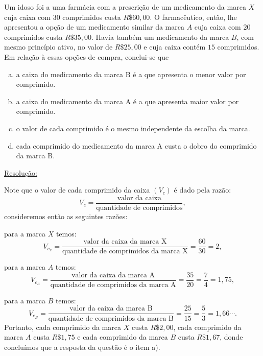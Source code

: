 \begin{exem}[Comperve - 2018]
 Um idoso foi a uma farmácia com a prescrição de um medicamento da marca $X$ cuja caixa com $30$ comprimidos custa $R\$ 60,00$. O farmacêutico, então, lhe apresentou a opção de um medicamento similar da marca $A$ cuja caixa com $20$ comprimidos custa $R\$ 35,00$. Havia também um medicamento da marca $B$, com mesmo princípio ativo, no valor de $R\$ 25,00$ e cuja caixa contém $15$ comprimidos. Em relação à essas opções de compra, conclui-se que

 \begin{enumerate}[a)]
  \item a caixa do medicamento da marca B é a que apresenta o menor valor por comprimido.
  \item a caixa do medicamento da marca A é a que apresenta maior valor por comprimido.
  \item o valor de cada comprimido é o mesmo independente da escolha da marca.
  \item cada comprimido do medicamento da marca A custa o dobro do comprimido da marca B.
 \end{enumerate}

\underline{Resolução:}

  Note que o valor de cada comprimido da caixa $(V_c)$ é dado pela razão:
\begin{equation}
V_c= \frac{\text{valor da caixa}}{\text{quantidade de comprimidos}} ,
\end{equation}
  consideremos então as seguintes razões:

  para a marca $X$ temos:
\begin{equation}
V_{c_x}=\frac{\text{valor da caixa da marca X}}{\text{quantidade de comprimidos da marca X}}= \frac{60}{30}= 2 ,
\end{equation}

  para a marca $A$ temos:
\begin{equation}
V_{c_A}=\frac{\text{valor da caixa da marca A}}{\text{quantidade de comprimidos da marca A}}= \frac{35}{20}= \frac{7}{4}= 1,75 ,
\end{equation}

  para a marca $B$ temos:
\begin{equation}
V_{c_B}=\frac{\text{valor da caixa da marca B}}{\text{quantidade de comprimidos da marca B}} = \frac{25}{15}= \frac{5}{3}= 1,66 \cdots .
\end{equation}
  Portanto, cada comprimido da marca $X$ custa $R\$ 2,00$, cada comprimido da marca $A$ custa $R\$ 1,75$ e cada comprimido da marca $B$ custa $R\$ 1,67$, donde concluímos que a resposta da questão é o item a).

  \fim
\end{exem}



